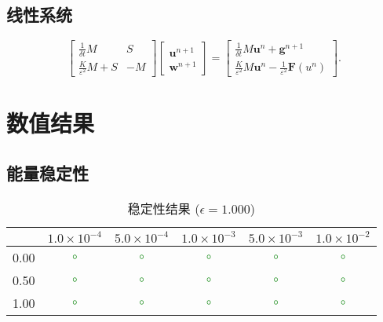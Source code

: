 \documentclass[12pt,a4paper]{article}
\begin{document}
\subsection{线性系统}

\[
\begin{bmatrix}
	\frac{1}{\delta t} M & S \\
	\frac{K}{\varepsilon^2} M + S & -M
\end{bmatrix}
\begin{bmatrix}
	\mathbf{u}^{n+1} \\
	\mathbf{w}^{n+1}
\end{bmatrix}
=
\begin{bmatrix}
	\frac{1}{\delta t} M \mathbf{u}^n + \mathbf{g}^{n+1} \\
	\frac{K}{\varepsilon^2} M \mathbf{u}^n - \frac{1}{\varepsilon^2} \mathbf{F}(u^n)
\end{bmatrix}.
\]

\section{数值结果}

\subsection{能量稳定性}

\begin{table}[h]
	\centering
	\caption{稳定性结果 ($\epsilon = 1.000$)}
	\begin{tabular}{c|ccccc}
		\toprule
		\diagbox{K}{$\Delta t$} & $1.0 \times 10^{-4}$ & $5.0 \times 10^{-4}$ & $1.0 \times 10^{-3}$ & $5.0 \times 10^{-3}$ & $1.0 \times 10^{-2}$ \\
		\midrule
		0.00 & \textcolor{green}{$\circ$} & \textcolor{green}{$\circ$} & \textcolor{green}{$\circ$} & \textcolor{green}{$\circ$} & \textcolor{green}{$\circ$} \\
		0.50 & \textcolor{green}{$\circ$} & \textcolor{green}{$\circ$} & \textcolor{green}{$\circ$} & \textcolor{green}{$\circ$} & \textcolor{green}{$\circ$} \\
		1.00 & \textcolor{green}{$\circ$} & \textcolor{green}{$\circ$} & \textcolor{green}{$\circ$} & \textcolor{green}{$\circ$} & \textcolor{green}{$\circ$} \\
		\bottomrule
	\end{tabular}
\end{table}
\end{document}
